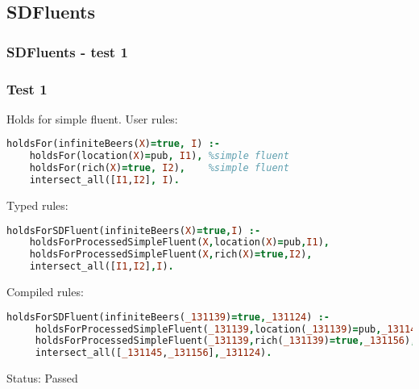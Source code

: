 \documentclass[8pt]{beamer}
\begin{document}
\subsection{SDFluents}
\begin{frame}[fragile]
\frametitle{SDFluents - test 1}
\subsubsection{Test 1}
\small
Holds for simple fluent.\linebreak
User rules:
\begin{tiny}
\begin{lstlisting}[language=Prolog]
holdsFor(infiniteBeers(X)=true, I) :- 
    holdsFor(location(X)=pub, I1), %simple fluent
    holdsFor(rich(X)=true, I2),    %simple fluent
    intersect_all([I1,I2], I).
\end{lstlisting}
\end{tiny}
Typed rules:
\begin{tiny}
\begin{lstlisting}[language=Prolog]
holdsForSDFluent(infiniteBeers(X)=true,I) :-
    holdsForProcessedSimpleFluent(X,location(X)=pub,I1),
    holdsForProcessedSimpleFluent(X,rich(X)=true,I2),
    intersect_all([I1,I2],I).
\end{lstlisting}
\end{tiny}
Compiled rules:
\begin{tiny}
\begin{lstlisting}[language=Prolog]
holdsForSDFluent(infiniteBeers(_131139)=true,_131124) :-
     holdsForProcessedSimpleFluent(_131139,location(_131139)=pub,_131145),
     holdsForProcessedSimpleFluent(_131139,rich(_131139)=true,_131156),
     intersect_all([_131145,_131156],_131124).
\end{lstlisting}
\end{tiny}
Status: Passed
\end{frame}
\end{document}
